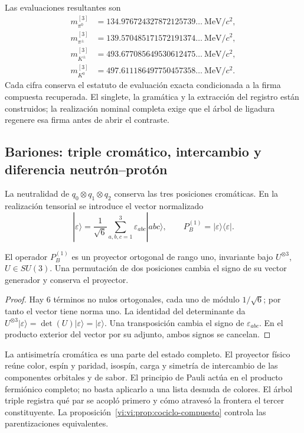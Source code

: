 Las evaluaciones resultantes son
\begin{align*}
 m_{\pi^0}^{[3]}&=134.976724327872125739\ldots\ \mathrm{MeV}/c^2,\\
 m_{\pi^\pm}^{[3]}&=139.570485171572191374\ldots\ \mathrm{MeV}/c^2,\\
 m_{K^\pm}^{[3]}&=493.677085649530612475\ldots\ \mathrm{MeV}/c^2,\\
 m_{K^0}^{[3]}&=497.611186497750457358\ldots\ \mathrm{MeV}/c^2.
\end{align*}
Cada cifra conserva el
estatuto de evaluación exacta condicionada a la firma compuesta
recuperada. El singlete, la gramática y la extracción del registro están
construidos; la realización nominal completa exige que el árbol de
ligadura regenere esa firma antes de abrir el contraste.

\subsection{Bariones: triple cromático, intercambio y diferencia neutrón--protón}
\label{vi:vi:subsec:bariones-familias}

La neutralidad de \(q_0\otimes q_1\otimes q_2\) conserva las tres
posiciones cromáticas. En la realización tensorial se introduce el vector
normalizado
\[
 |\varepsilon\rangle=\frac1{\sqrt6}
 \sum_{a,b,c=1}^3\varepsilon_{abc}|abc\rangle,
 \qquad P_B^{(1)}=|\varepsilon\rangle\langle\varepsilon|.
\]

\begin{proposition}
\label{vi:vi:prop:singlete-barion}
El operador \(P_B^{(1)}\) es un proyector ortogonal de rango uno,
invariante bajo \(U^{\otimes3}\), \(U\in SU(3)\). Una permutación
de dos posiciones cambia el signo de su vector generador y conserva
el proyector.
\end{proposition}
\begin{proof}
Hay \(6\) términos no nulos ortogonales, cada uno de módulo
\(1/\sqrt6\); por tanto el vector tiene norma uno. La identidad
del determinante da
\(U^{\otimes3}|\varepsilon\rangle=
\det(U)|\varepsilon\rangle=|\varepsilon\rangle\).
Una transposición cambia el signo de \(\varepsilon_{abc}\). En el
producto exterior del vector por su adjunto, ambos signos se cancelan.
\end{proof}

La antisimetría cromática es una parte del estado completo. El proyector
físico reúne color, espín y paridad, isospín, carga y simetría de
intercambio de las componentes orbitales y de sabor. El principio de
Pauli actúa en el producto fermiónico completo; no basta aplicarlo a una
lista desnuda de colores. El árbol triple registra qué par se acopló
primero y cómo atravesó la frontera el tercer constituyente. La
proposición~\ref{vi:vi:prop:cociclo-compuesto} controla las
parentizaciones equivalentes.


